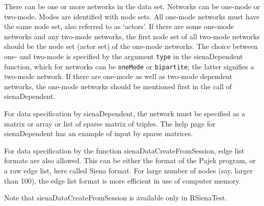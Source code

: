 \documentclass[a4paper,fleqn,11pt]{article}
\newcommand{\+}{\, + \,}
\begin{document}
There can be one or more networks in the data set.
Networks can be one-mode or two-mode.
Modes are identified with node sets.
All one-mode networks must have the same node set,
also referred to as `actors'.
If there are some one-mode networks and any two-mode networks,
the first node set of all two-mode networks should be the node set
(actor set) of the one-mode networks.
The choice between one- and two-mode is specified by the argument
\texttt{type} in  the \textsf{sienaDependent} function, which for
networks can be \texttt{oneMode} or \texttt{bipartite};
the latter signifies a two-mode network.
If there are one-mode as well as two-mode dependent networks,
the one-mode networks should be mentioned first in the call of
\textsf{sienaDependent}.


For data specification by  \textsf{sienaDependent}, the network
must be specified as a matrix or array or list of sparse matrix of triples.
The help page for \textsf{sienaDependent} has an example of input
by sparse matrices.

For data specification by
the function \textsf{sienaDataCreateFromSession},
edge list formats are also allowed. This can be either the
format of the Pajek program, or a raw edge list, here called Siena format.
For large number of nodes (say, larger than 100), the edge list
format is more efficient in use of computer memory.

Note that  \textsf{sienaDataCreateFromSession} is available only
in  \textsf{RSienaTest}.
\end{document}

